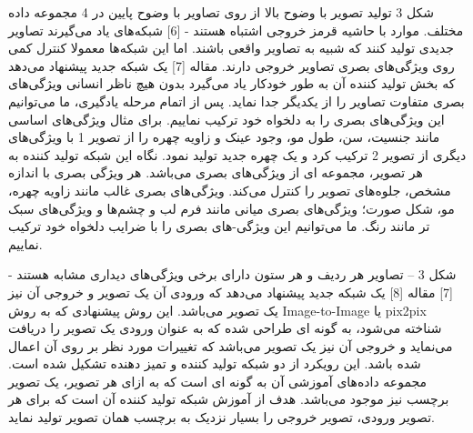   شکل ‏3   تولید تصویر با وضوح بالا از روی تصاویر با وضوح پایین در 4 مجموعه داده مختلف. موارد با حاشیه قرمز خروجی‌ اشتباه هستند - [6]
شبکه‌های  یاد می‌گیرند تصاویر جدیدی تولید کنند که شبیه به تصاویر واقعی باشند. اما این شبکه‌ها معمولا کنترل کمی روی ویژگی‌های بصری تصاویر خروجی دارند.
مقاله [7] یک شبکه  جدید پیشنهاد می‌دهد که بخش تولید کننده آن به طور خودکار یاد می‌گیرد بدون هیچ ناظر انسانی ویژگی‌های بصری متفاوت تصاویر را از یکدیگر جدا نماید. پس از اتمام مرحله یادگیری، ما می‌توانیم این ویژگی‌های بصری را به دلخواه خود ترکیب نماییم. برای مثال ویژگی‌های اساسی مانند جنسیت، سن، طول مو، وجود عینک و زاویه چهره را از تصویر 1 با ویژگی‌های دیگری از تصویر 2 ترکیب کرد و یک چهره جدید تولید نمود. نگاه این شبکه تولید کننده به هر تصویر، مجموعه ای از ویژگی‌های بصری می‌باشد. هر ویژگی بصری با اندازه مشخص، جلوه‌های تصویر را کنترل می‌کند. ویژگی‌های بصری غالب مانند زاویه چهره، مو، شکل صورت؛ ویژگی‌های بصری میانی مانند فرم لب و چشم‌ها و ویژگی‌های سبک تر مانند رنگ. ما می‌توانیم این ویژگی-های بصری را با ضرایب دلخواه خود ترکیب نماییم.
 
شکل ‏3 – تصاویر هر ردیف و هر ستون دارای برخی ویژگی‌های دیداری مشابه هستند - [7]
مقاله [8] یک شبکه  جدید پیشنهاد می‌دهد که ورودی آن یک تصویر و خروجی آن نیز یک تصویر می‌باشد. این روش پیشنهادی که به روش Image-to-Image یا pix2pix شناخته می‌شود، به گونه ای طراحی شده که به عنوان ورودی یک تصویر را دریافت می‌نماید و خروجی آن نیز یک تصویر می‌باشد که تغییرات مورد نظر بر روی آن اعمال شده باشد. این رویکرد از دو شبکه تولید کننده و تمیز دهنده تشکیل شده است. مجموعه داده‌های آموزشی آن به گونه ای است که به ازای هر تصویر، یک تصویر برچسب نیز موجود می‌باشد. هدف از آموزش شبکه تولید کننده آن است که برای هر تصویر ورودی، تصویر خروجی را بسیار نزدیک به برچسب همان تصویر تولید نماید.
     
